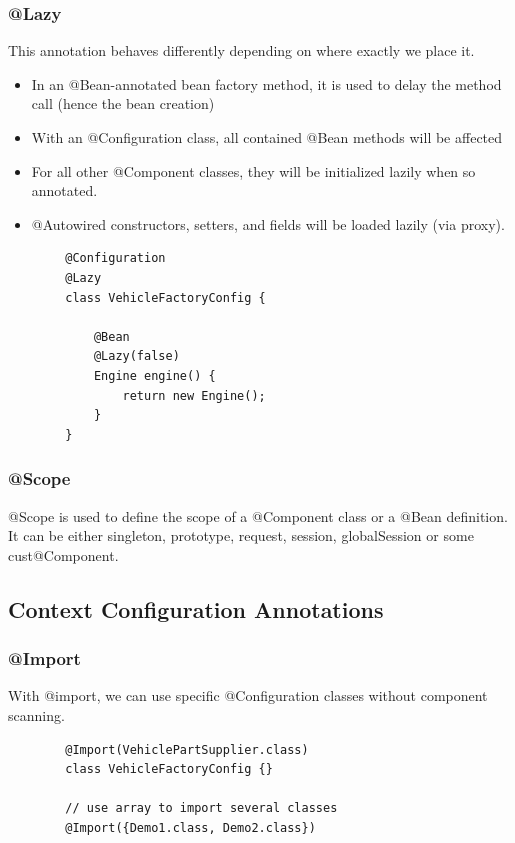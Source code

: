 \documentclass{scrartcl}
\begin{document}
\subsubsection{@Lazy}

    This annotation behaves differently depending on where exactly we place it.

    \begin{itemize}
        \item In an @Bean-annotated bean factory method, it is used to delay the method call (hence the bean creation)
        \item With an @Configuration class, all contained @Bean methods will be affected
        \item For all other @Component classes,  they will be initialized lazily when so annotated.
        \item @Autowired constructors, setters, and fields will be loaded lazily (via proxy).
    \end{itemize}

    \begin{lstlisting}
        @Configuration
        @Lazy
        class VehicleFactoryConfig {

            @Bean
            @Lazy(false)
            Engine engine() {
                return new Engine();
            }
        }
    \end{lstlisting}

\subsubsection{@Scope}

    @Scope is used to define the scope of a @Component class or a @Bean definition. It can be either singleton, prototype, request, session, globalSession or some cust@Component.

\subsection{Context Configuration Annotations}

\subsubsection{@Import}

    With @import, we can use specific @Configuration classes without component scanning.

    \begin{lstlisting}
        @Import(VehiclePartSupplier.class)
        class VehicleFactoryConfig {}

        // use array to import several classes
        @Import({Demo1.class, Demo2.class})
    \end{lstlisting}
\end{document}
